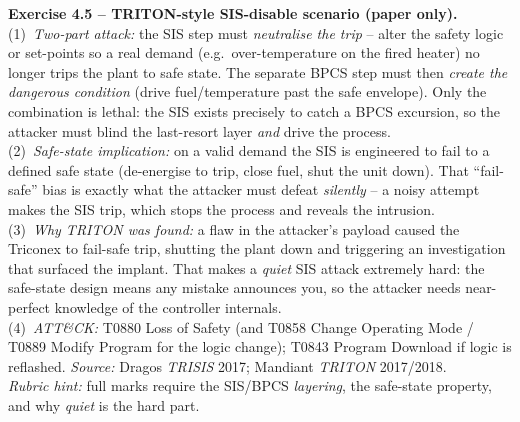\documentclass[11pt,a4paper]{article}
\begin{document}
\begin{solutionbox}
\textbf{Exercise 4.5 -- TRITON-style SIS-disable scenario (paper only).}\\[2pt]
(1)~\emph{Two-part attack:} the SIS step must \emph{neutralise the trip} -- alter the safety logic
or set-points so a real demand (e.g.\ over-temperature on the fired heater) no longer trips the
plant to safe state. The separate BPCS step must then \emph{create the dangerous condition} (drive
fuel/temperature past the safe envelope). Only the combination is lethal: the SIS exists precisely
to catch a BPCS excursion, so the attacker must blind the last-resort layer \emph{and} drive the
process.\\
(2)~\emph{Safe-state implication:} on a valid demand the SIS is engineered to fail to a defined safe
state (de-energise to trip, close fuel, shut the unit down). That ``fail-safe'' bias is exactly what
the attacker must defeat \emph{silently} -- a noisy attempt makes the SIS trip, which stops the
process and reveals the intrusion.\\
(3)~\emph{Why TRITON was found:} a flaw in the attacker's payload caused the Triconex to fail-safe
trip, shutting the plant down and triggering an investigation that surfaced the implant. That makes
a \emph{quiet} SIS attack extremely hard: the safe-state design means any mistake announces you, so
the attacker needs near-perfect knowledge of the controller internals.\\
(4)~\emph{ATT\&CK:} T0880 Loss of Safety (and T0858 Change Operating Mode / T0889 Modify Program for
the logic change); T0843 Program Download if logic is reflashed. \emph{Source:} Dragos
\emph{TRISIS} 2017; Mandiant \emph{TRITON} 2017/2018.\\[2pt]
\emph{Rubric hint:} full marks require the SIS/BPCS \emph{layering}, the safe-state property, and
why \emph{quiet} is the hard part.
\end{solutionbox}
\end{document}
